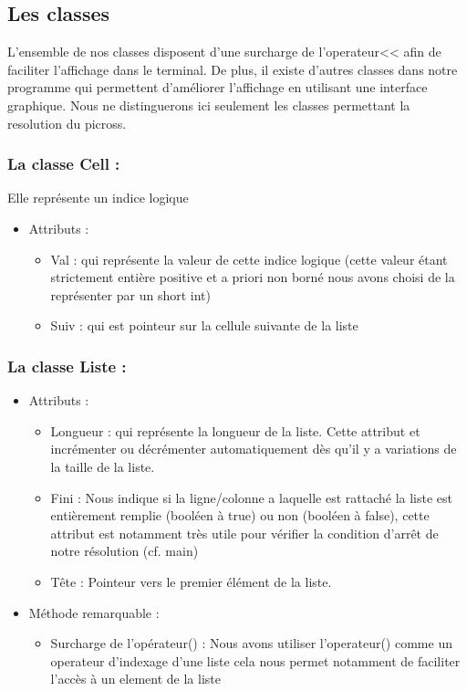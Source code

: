 \documentclass{article}
\begin{document}
\subsection{ Les classes}
L'ensemble de nos classes disposent d'une surcharge de l'operateur<< afin de faciliter l'affichage dans le terminal. De plus, il existe d'autres classes dans notre
programme qui permettent d'am\'eliorer l'affichage en utilisant une interface graphique. Nous ne distinguerons ici seulement les classes permettant la
resolution du picross.

\subsubsection{La classe Cell :}
Elle repr\'esente un indice logique
\begin{itemize}
\item Attributs :
\begin{itemize}
\item Val : qui repr\'esente la valeur de cette indice logique (cette valeur \'etant strictement enti\`ere positive et a priori non born\'e nous avons choisi de la repr\'esenter par un short int)
\item Suiv : qui est pointeur sur la cellule suivante de la liste
\end{itemize}
\end{itemize}
\subsubsection{La classe Liste :}
\begin{itemize}
\item Attributs :
\begin{itemize}
\item Longueur : qui repr\'esente la longueur de la liste. Cette attribut et incr\'ementer ou d\'ecr\'ementer automatiquement d\`es qu'il y a variations de la taille de la
liste.
\item Fini : Nous indique si la ligne/colonne a laquelle est rattach\'e la liste est enti\`erement remplie (bool\'een \`a  true) ou non (bool\'een \`a  false), cette attribut est
notamment tr\`es utile pour v\'erifier la condition d'arrêt de notre r\'esolution (cf. main)
\item Tête : Pointeur vers le premier \'el\'ement de la liste.
\end{itemize}
\item M\'ethode remarquable :
\begin{itemize}
\item Surcharge de l'op\'erateur() : Nous avons utiliser l'operateur() comme un operateur d'indexage d'une liste cela nous permet notamment de faciliter l'acc\`es
\`a un element de la liste
\end{itemize}
\end{itemize}
\end{document}
